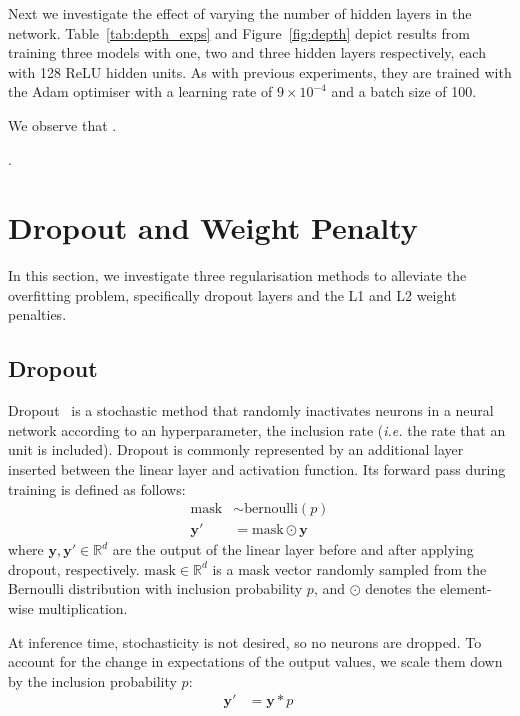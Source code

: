 \documentclass{article}
\begin{document}
\questionTableTwo
\questionFigureThree

Next we investigate the effect of varying the number of hidden layers in the network. 
Table~\ref{tab:depth_exps} and Figure~\ref{fig:depth} depict results from training three models with one, two and three hidden layers respectively, each with 128 ReLU hidden units. 
As with previous experiments, they are trained with the Adam optimiser with a learning rate of $9 \times 10^{-4}$ and a batch size of 100. 

We observe that \questionTen.

\questionEleven.




\section{Dropout and Weight Penalty}
\label{sec:task2.1} 

In this section, we investigate three regularisation methods to alleviate the overfitting problem, specifically dropout layers and the L1 and L2 weight penalties.


\subsection{Dropout}

Dropout~\cite{srivastava2014dropout} is a stochastic method that randomly inactivates neurons in a neural network according to an hyperparameter, the inclusion rate  (\textit{i.e.} the rate that an unit is included).
Dropout is commonly represented by an additional layer inserted between the linear layer and activation function.
Its forward pass during training is defined as follows:
\begin{align}
    \text{mask} &\sim \text{bernoulli}(p)\\
    \bm{y}' &= \text{mask} \odot \bm{y}\
\end{align}
where $\bm{y}, \bm{y}' \in \mathbb{R}^d$ are the output of the linear layer before and after applying dropout, respectively. 
$\text{mask} \in \mathbb{R}^d$ is a mask vector randomly sampled from the Bernoulli distribution with inclusion probability $p$, and $\odot$ denotes the element-wise multiplication.

At inference time, stochasticity is not desired, so no neurons are dropped. 
To account for the change in expectations of the output values, we scale them down by the inclusion probability $p$:
\begin{align}
    \bm{y}' &= \bm{y}*p\
\end{align}
\end{document}

